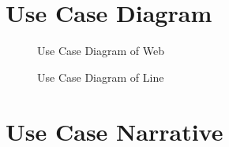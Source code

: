 \documentclass[12pt,oneside,openright,a4paper]{cpe-english-project}
\begin{document}
  \section{Use Case Diagram}
  \begin{figure}[!h]
    \centering
    \caption{Use Case Diagram of Web}\label{fig:Use_Case_web}
  \end{figure}
  \begin{figure}[!h]
    \centering
    \caption{Use Case Diagram of Line}\label{fig:Use_Case_line}
  \end{figure}

  \newpage
  \section{Use Case Narrative}
\end{document}
